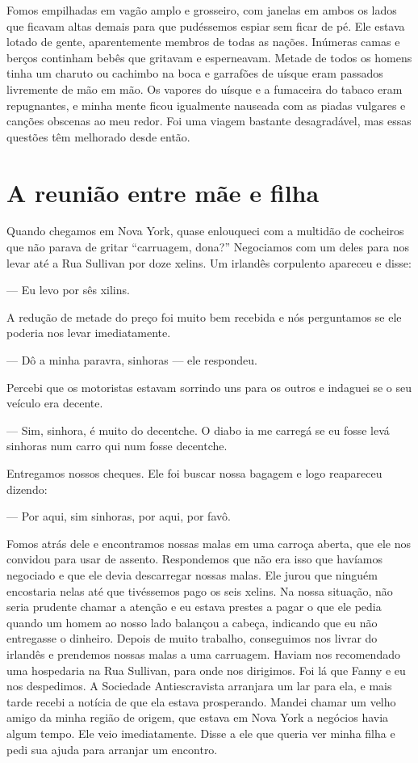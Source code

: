 Fomos empilhadas em vagão amplo e
grosseiro, com janelas em ambos os lados que ficavam altas demais para
que pudéssemos espiar sem ficar de pé. Ele estava lotado de gente,
aparentemente membros de todas as nações. Inúmeras camas e berços
continham bebês que gritavam e esperneavam. Metade de todos os homens
tinha um charuto ou cachimbo na boca e garrafões de uísque eram passados
livremente de mão em mão. Os vapores do uísque e a fumaceira do tabaco
eram repugnantes, e minha mente ficou igualmente nauseada com as piadas
vulgares e canções obscenas ao meu redor. Foi uma viagem bastante
desagradável, mas essas questões têm melhorado desde então.

\chapter*{A reunião entre mãe e filha}

Quando chegamos em Nova York, quase
enlouqueci com a multidão de cocheiros que não parava de gritar
``carruagem, dona?'' Negociamos com um deles para nos levar até a Rua
Sullivan por doze xelins. Um irlandês corpulento apareceu e disse:

--- Eu levo por sês xilins.

A redução de metade do preço foi muito bem recebida e nós perguntamos se
ele poderia nos levar imediatamente.

--- Dô a minha paravra, sinhoras --- ele respondeu.

Percebi que os motoristas estavam sorrindo uns para os outros e indaguei
se o seu veículo era decente.

--- Sim, sinhora, é muito do decentche. O diabo ia me carregá se eu
fosse levá sinhoras num carro qui num fosse decentche.

Entregamos nossos cheques. Ele foi buscar nossa bagagem e logo
reapareceu dizendo:

--- Por aqui, sim sinhoras, por aqui, por favô.

Fomos atrás dele e encontramos nossas malas em uma carroça aberta, que
ele nos convidou para usar de assento. Respondemos que não era isso que
havíamos negociado e que ele devia descarregar nossas malas. Ele jurou
que ninguém encostaria nelas até que tivéssemos pago os seis xelins. Na
nossa situação, não seria prudente chamar a atenção e eu estava prestes
a pagar o que ele pedia quando um homem ao nosso lado balançou a cabeça,
indicando que eu não entregasse o dinheiro. Depois de muito trabalho,
conseguimos nos livrar do irlandês e prendemos nossas malas a uma
carruagem. Haviam nos recomendado uma hospedaria na Rua Sullivan, para
onde nos dirigimos. Foi lá que Fanny e eu nos despedimos. A Sociedade
Antiescravista arranjara um lar para ela, e mais tarde recebi a notícia
de que ela estava prosperando. Mandei chamar um velho amigo da minha
região de origem, que estava em Nova York a negócios havia algum tempo.
Ele veio imediatamente. Disse a ele que queria ver minha filha e pedi
sua ajuda para arranjar um encontro.

